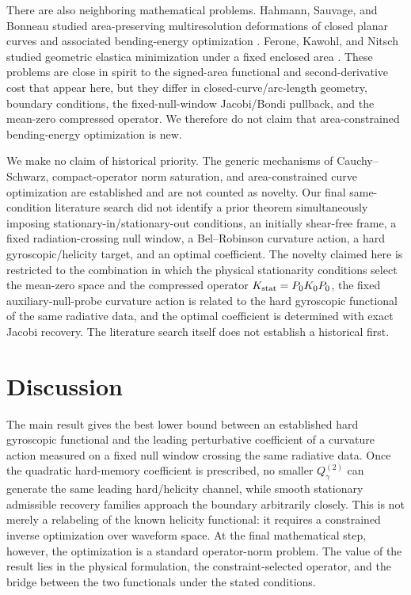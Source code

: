 There are also neighboring mathematical problems. Hahmann, Sauvage, and Bonneau studied area-preserving multiresolution deformations of closed planar curves and associated bending-energy optimization \cite{Hahmann2005}. Ferone, Kawohl, and Nitsch studied geometric elastica minimization under a fixed enclosed area \cite{Ferone2016}. These problems are close in spirit to the signed-area functional and second-derivative cost that appear here, but they differ in closed-curve/arc-length geometry, boundary conditions, the fixed-null-window Jacobi/Bondi pullback, and the mean-zero compressed operator. We therefore do not claim that area-constrained bending-energy optimization is new.

We make no claim of historical priority. The generic mechanisms of Cauchy--Schwarz, compact-operator norm saturation, and area-constrained curve optimization are established and are not counted as novelty. Our final same-condition literature search did not identify a prior theorem simultaneously imposing stationary-in/stationary-out conditions, an initially shear-free frame, a fixed radiation-crossing null window, a Bel--Robinson curvature action, a hard gyroscopic/helicity target, and an optimal coefficient. The novelty claimed here is restricted to the combination in which the physical stationarity conditions select the mean-zero space and the compressed operator $K_{\rm stat}=P_0K_0P_0$, the fixed auxiliary-null-probe curvature action is related to the hard gyroscopic functional of the same radiative data, and the optimal coefficient is determined with exact Jacobi recovery. The literature search itself does not establish a historical first.

\section{Discussion}
The main result gives the best lower bound between an established hard gyroscopic functional and the leading perturbative coefficient of a curvature action measured on a fixed null window crossing the same radiative data. Once the quadratic hard-memory coefficient is prescribed, no smaller $Q_\gamma^{(2)}$ can generate the same leading hard/helicity channel, while smooth stationary admissible recovery families approach the boundary arbitrarily closely. This is not merely a relabeling of the known helicity functional: it requires a constrained inverse optimization over waveform space. At the final mathematical step, however, the optimization is a standard operator-norm problem. The value of the result lies in the physical formulation, the constraint-selected operator, and the bridge between the two functionals under the stated conditions.

